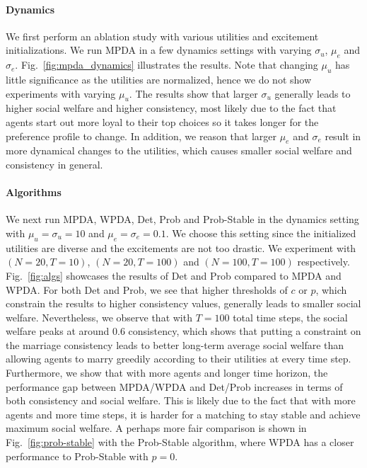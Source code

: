 \paragraph{Dynamics} We first perform an ablation study with various utilities and excitement initializations. We run MPDA in a few dynamics settings with varying $\sigma_u$, $\mu_e$ and $\sigma_e$. Fig.~\ref{fig:mpda_dynamics} illustrates the results. Note that changing $\mu_u$ has little significance as the utilities are normalized, hence we do not show experiments with varying $\mu_u$. The results show that larger $\sigma_u$ generally leads to higher social welfare and higher consistency, most likely due to the fact that agents start out more loyal to their top choices so it takes longer for the preference profile to change. In addition, we reason that larger $\mu_e$ and $\sigma_e$ result in more dynamical changes to the utilities, which causes smaller social welfare and consistency in general.



\paragraph{Algorithms} We next run MPDA, WPDA, Det, Prob and Prob-Stable in the dynamics setting with $\mu_u = \sigma_u = 10$ and $\mu_e = \sigma_e = 0.1$. We choose this setting since the initialized utilities are diverse and the excitements are not too drastic. We experiment with $(N=20, T=10)$, $(N=20, T=100)$ and $(N=100, T=100)$ respectively. Fig.~\ref{fig:algs} showcases the results of Det and Prob compared to MPDA and WPDA. For both Det and Prob, we see that higher thresholds of $c$ or $p$, which constrain the results to higher consistency values, generally leads to smaller social welfare. Nevertheless, we observe that with $T=100$ total time steps, the social welfare peaks at around 0.6 consistency, which shows that putting a constraint on the marriage consistency leads to better long-term average social welfare than allowing agents to marry greedily according to their utilities at every time step. Furthermore, we show that with more agents and longer time horizon, the performance gap between MPDA/WPDA and Det/Prob increases in terms of both consistency and social welfare. This is likely due to the fact that with more agents and more time steps, it is harder for a matching to stay stable and achieve maximum social welfare. A perhaps more fair comparison is shown in Fig.~\ref{fig:prob-stable} with the Prob-Stable algorithm, where WPDA has a closer performance to Prob-Stable with $p=0$.

